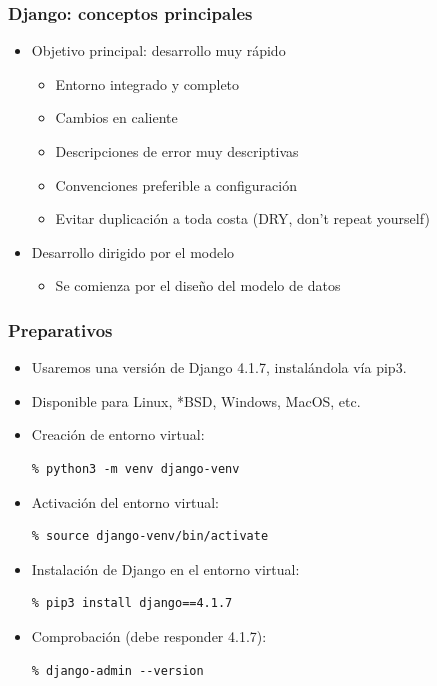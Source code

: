 \begin{frame}
\frametitle{Django: conceptos principales}

\begin{itemize}
\item Objetivo principal: desarrollo muy rápido
  \begin{itemize}
  \item Entorno integrado y completo
  \item Cambios en caliente
  \item Descripciones de error muy descriptivas
  \item Convenciones preferible a configuración
  \item Evitar duplicación a toda costa (DRY, don't repeat yourself)
  \end{itemize}
\item Desarrollo dirigido por el modelo
  \begin{itemize}
  \item Se comienza por el diseño del modelo de datos
  \end{itemize}
\end{itemize}

\end{frame}


\begin{frame}[fragile]
\frametitle{Preparativos}

\begin{itemize}
\item Usaremos una versión de Django 4.1.7, instalándola vía pip3.
\item Disponible para Linux, *BSD, Windows, MacOS, etc.
\item Creación de entorno virtual:

\begin{verbatim}
% python3 -m venv django-venv    
\end{verbatim}

\item Activación del entorno virtual:

\begin{verbatim}
% source django-venv/bin/activate
\end{verbatim}

\item Instalación de Django en el entorno virtual:

\begin{verbatim}
% pip3 install django==4.1.7
\end{verbatim}

\item Comprobación (debe responder 4.1.7):
\begin{verbatim}
% django-admin --version
\end{verbatim}
\end{itemize}


\end{frame}


